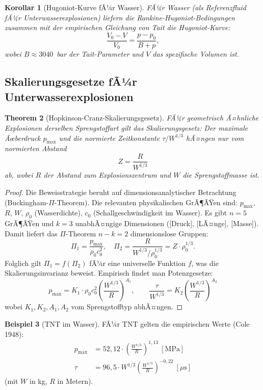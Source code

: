 ﻿\documentclass[12pt,a4paper]{article}
\newtheorem{theorem}{Theorem}[section]
\newtheorem{corollary}[theorem]{Korollar}
\theoremstyle{definition}
\newtheorem{example}[theorem]{Beispiel}
\theoremstyle{remark}
\begin{document}
\begin{corollary}[Hugoniot-Kurve fÃ¼r Wasser]
\label{cor:hugoniot}
FÃ¼r Wasser (als Referenzfluid fÃ¼r Unterwasserexplosionen) liefern die Rankine-Hugoniot-Bedingungen zusammen mit der empirischen Gleichung von Tait die Hugoniot-Kurve:
\begin{equation}
\frac{V_0 - V}{V_0} = \frac{p - p_0}{B + p},
\label{eq:hugoniot_wasser}
\end{equation}
wobei $B \approx 3040$~bar der Tait-Parameter und $V$ das spezifische Volumen ist.
\end{corollary}

\subsection{Skalierungsgesetze fÃ¼r Unterwasserexplosionen}

\begin{theorem}[Hopkinson-Cranz-Skalierungsgesetz]
\label{thm:hopkinson}
FÃ¼r geometrisch Ã¤hnliche Explosionen derselben Sprengstoffart gilt das Skalierungsgesetz: Der maximale Ãœberdruck $p_{\max}$ und die normierte Zeitkonstante $\tau/W^{1/3}$ hÃ¤ngen nur vom normierten Abstand
\[
Z = \frac{R}{W^{1/3}}
\]
ab, wobei $R$ der Abstand zum Explosionszentrum und $W$ die Sprengstoffmasse ist.
\end{theorem}
\begin{proof}
Die Beweisstrategie beruht auf dimensionsanalytischer Betrachtung (Buckingham-$\Pi$-Theorem). Die relevanten physikalischen GrÃ¶ÃŸen sind: $p_{\max}$, $R$, $W$, $\rho_0$ (Wasserdichte), $c_0$ (Schallgeschwindigkeit im Wasser). Es gibt $n=5$ GrÃ¶ÃŸen und $k=3$ unabhÃ¤ngige Dimensionen ([Druck], [LÃ¤nge], [Masse]). Damit liefert das $\Pi$-Theorem $n - k = 2$ dimensionslose Gruppen:
\[
\Pi_1 = \frac{p_{\max}}{\rho_0 c_0^2}, \quad \Pi_2 = \frac{R}{W^{1/3}/\rho_0^{1/3}} = Z\cdot\rho_0^{1/3}.
\]
Folglich gilt $\Pi_1 = f(\Pi_2)$ fÃ¼r eine universelle Funktion $f$, was die Skalierungsinvarianz beweist. Empirisch findet man Potenzgesetze:
\begin{equation}
p_{\max} = K_1 \cdot \rho_0 c_0^2 \left(\frac{W^{1/3}}{R}\right)^{A_1}, \qquad \frac{\tau}{W^{1/3}} = K_2 \left(\frac{W^{1/3}}{R}\right)^{A_2}
\end{equation}
wobei $K_1, K_2, A_1, A_2$ vom Sprengstofftyp abhÃ¤ngen. 
\end{proof}

\begin{example}[TNT im Wasser]
FÃ¼r TNT gelten die empirischen Werte (Cole 1948):
\begin{align}
p_{\max} &= 52{,}12 \cdot \left(\frac{W^{1/3}}{R}\right)^{1{,}13}~[\text{MPa}]\\
\tau &= 96{,}5 \cdot W^{1/3} \left(\frac{W^{1/3}}{R}\right)^{-0{,}22}~[\mu\text{s}]
\end{align}
(mit $W$ in kg, $R$ in Metern).
\end{example}
\end{document}
